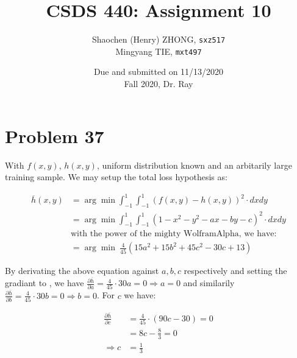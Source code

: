 \documentclass[12pt]{article}
\newcommand{\ilcode}{\texttt}
\newcommand{\p}{\partial}
\begin{document}
\title{\textbf{CSDS 440: Assignment 10}}

\author{Shaochen (Henry) ZHONG, \ilcode{sxz517} \\ Mingyang TIE, \ilcode{mxt497}}
\date{Due and submitted on 11/13/2020 \\ Fall 2020, Dr. Ray}
\maketitle


\section{Problem 37}

With $f(x, y)$, $h(x, y)$, uniform distribution known and an arbitarily large training sample. We may setup the total loss hypothesis as:

\begin{align*}
    \overline{h}(x, y) &= \arg\min \int_{-1}^1 \int_{-1}^1 (f(x, y) - h(x, y))^2 \cdot dxdy \\
    &= \arg\min \int_{-1}^1 \int_{-1}^1 (1 - x^2 - y^2 - ax - by -c)^2 \cdot dxdy \\
    &\text{with the power of the mighty WolframAlpha, we have: } \\
    &= \arg\min \  \frac{4}{45} (15 a^2 + 15 b^2 + 45 c^2 - 30 c + 13)
\end{align*}


By derivating the above equation against $a, b, c$ respectively and setting the gradiant to $ $, we have $\frac{\p \overline{h}}{\p a} = \frac{4}{45} \cdot  30a = 0 \Longrightarrow a = 0$ and similarily $\frac{\p \overline{h}}{\p b} = \frac{4}{45} \cdot 30b = 0 \Longrightarrow b = 0$. For $c$ we have:

\begin{align*}
    \frac{\p \overline{h}}{\p c} &= \frac{4}{45} \cdot (90c - 30) = 0 \\
    &= 8c - \frac{8}{3} = 0 \\
    \Rightarrow c &= \frac{1}{3}
\end{align*}
\end{document}
